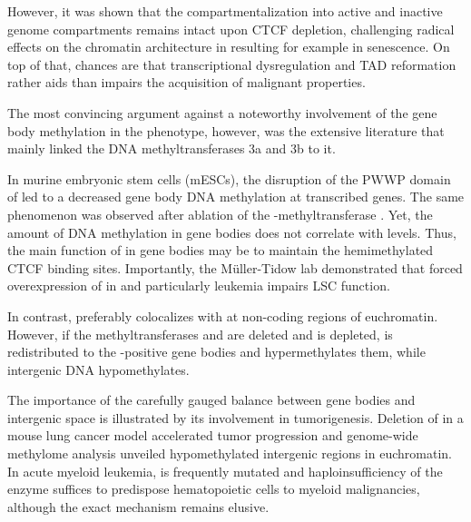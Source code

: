 However, it was shown that the compartmentalization into active and inactive genome compartments remains intact upon CTCF depletion\cite{Nora2017}, challenging radical effects on the chromatin architecture in \dnmtchip resulting for example in senescence. On top of that, chances are that transcriptional dysregulation and TAD reformation rather aids than impairs the acquisition of malignant properties. 

The most convincing argument against a noteworthy involvement of the gene body methylation in the \dnmtchip phenotype, however, was the extensive literature that mainly linked the DNA methyltransferases 3a and 3b to it. 

In murine embryonic stem cells (mESCs), the disruption of the PWWP domain of  led to a decreased gene body DNA methylation at transcribed genes\cite{Baubec2015}. The same phenomenon was observed after  
ablation of the \histhirtysixthree-methyltransferase \cite{Baubec2015}. Yet, the amount of DNA methylation in gene bodies does not correlate with \histhirtysixthree levels\cite{Nanan2017}. Thus, the main function of  in gene bodies may be to maintain the hemimethylated CTCF binding sites\cite{Xu2018b}.
Importantly, the Müller-Tidow lab demonstrated that forced overexpression of  in \mllafnine and particularly \mycbcltwo leukemia impairs LSC function\cite{Schulze2016}.

In contrast,  preferably colocalizes with \histhirtysixtwo at non-coding regions of euchromatin\cite{Weinberg2019}. However, if the \histhirtysixtwo methyltransferases  and  are deleted and is \histhirtysixtwo depleted,  is redistributed to the \histhirtysixthree-positive gene bodies and hypermethylates them, while intergenic DNA hypomethylates\cite{Weinberg2019}.  

The importance of the carefully gauged  balance between gene bodies and intergenic space is illustrated by its involvement in tumorigenesis. Deletion of   in a mouse lung cancer model accelerated tumor progression\cite{Gao2011} and genome-wide methylome analysis unveiled hypomethylated intergenic regions in euchromatin\cite{Raddatz2012}.  In acute myeloid leukemia,  is frequently mutated\cite{Eriksson2015,Rau2016} and haploinsufficiency of the enzyme suffices to predispose hematopoietic cells to myeloid malignancies, although the exact mechanism remains elusive\cite{Cole2017}.  

